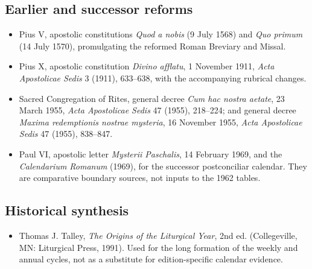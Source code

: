 \subsection{Earlier and successor reforms}

\begin{itemize}[leftmargin=1.5em,itemsep=0.45em]
\item Pius V, apostolic constitutions \emph{Quod a nobis} (9 July 1568) and \emph{Quo primum} (14 July 1570), promulgating the reformed Roman Breviary and Missal.
\item Pius X, apostolic constitution \emph{Divino afflatu}, 1 November 1911, \emph{Acta Apostolicae Sedis} 3 (1911), 633--638, with the accompanying rubrical changes.
\item Sacred Congregation of Rites, general decree \emph{Cum hac nostra aetate}, 23 March 1955, \emph{Acta Apostolicae Sedis} 47 (1955), 218--224; and general decree \emph{Maxima redemptionis nostrae mysteria}, 16 November 1955, \emph{Acta Apostolicae Sedis} 47 (1955), 838--847.
\item Paul VI, apostolic letter \emph{Mysterii Paschalis}, 14 February 1969, and the \emph{Calendarium Romanum} (1969), for the successor postconciliar calendar. They are comparative boundary sources, not inputs to the 1962 tables.
\end{itemize}

\subsection{Historical synthesis}

\begin{itemize}[leftmargin=1.5em,itemsep=0.45em]
\item Thomas J. Talley, \emph{The Origins of the Liturgical Year}, 2nd ed. (Collegeville, MN: Liturgical Press, 1991). Used for the long formation of the weekly and annual cycles, not as a substitute for edition-specific calendar evidence.
\end{itemize}
